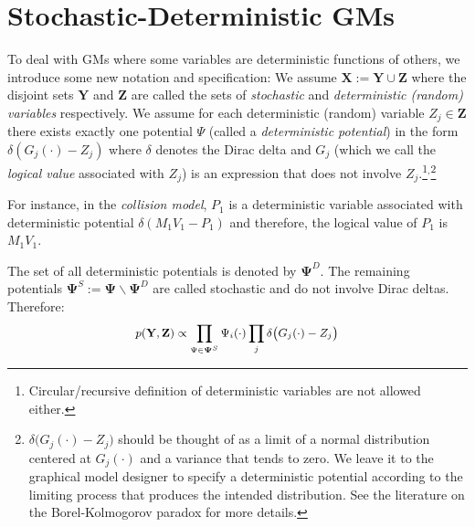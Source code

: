 \documentclass[]{article}
\newcommand{\bvec}[1]{\textbf{#1}}
\newcommand{\pr}{p}
\begin{document}
\section{Stochastic-Deterministic GMs}
\label{sect:contribution1}
To deal with GMs where some variables are deterministic functions of others,
we introduce some new notation and specification:
We assume $\bvec{X} := \bvec{Y} \cup \bvec{Z}$
where the disjoint sets $\bvec{Y}$ and $\bvec{Z}$ are called the sets of \emph{stochastic} and \emph{deterministic  (random) variables} respectively. 
We assume for each deterministic (random) variable $Z_j \in  \bvec{Z}$ there exists 
exactly one potential $\Psi$ (called a \emph{deterministic potential}) in the form
$\delta(G_j (\cdot) - Z_j)$ where  $\delta$ denotes the Dirac delta and $G_j$ (which we call the \emph{logical value} associated with $Z_j$) is 
an expression that does not involve $Z_j$.\footnote{Circular/recursive definition of deterministic variables are not allowed either.}$^{,}$\footnote{
$\delta\big( G_j(\cdot) - Z_j \big)$ should be thought of as a limit of a normal distribution centered at $G_j(\cdot)$ and a variance that tends to zero.
We leave it to the graphical model designer to specify a deterministic potential 
according to the limiting process that produces the intended distribution. 
See the literature on the Borel-Kolmogorov paradox \citep{kolmogorov1950foundations} for more details.}

For instance, in the \emph{collision model}, $P_1$ is a deterministic variable associated
with deterministic potential $\delta(M_1V_1 - P_1)$ 
and therefore, the logical value of $P_1$ is $M_1 V_1$.

The set of all deterministic potentials is denoted by $\boldsymbol{\Psi}^D$.
The remaining potentials $\boldsymbol{\Psi}^S := \boldsymbol{\Psi} \backslash \boldsymbol{\Psi}^D$ are called stochastic and do not involve Dirac deltas. 
Therefore:
\begin{equation}\footnotesize
\label{e:infer.sd}
\pr(\bvec{Y}, \bvec{Z}) \propto 
\prod_{\Psi \in \boldsymbol{\Psi}^S} \Psi_i (\cdot)
\prod_j \delta \big(G_j(\cdot) - Z_j
\big)
\end{equation}
\end{document}
